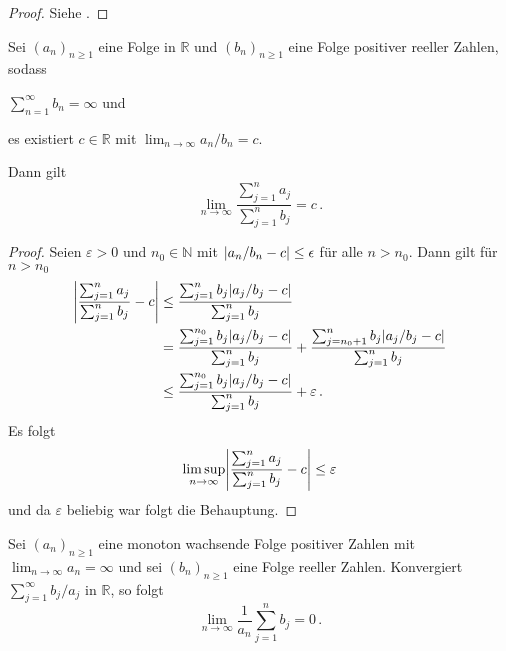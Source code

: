 \documentclass[ngerman,a4paper,11pt]{scrartcl}
\newcommand{\NN}{\mathbb{N}}
\newcommand{\RR}{\mathbb{R}}
\DeclarePairedDelimiter{\abs}{\lvert}{\rvert}		%
\begin{document}
\begin{proof}
 Siehe \cite[Satz~5.31 und Bemerkung~5.32(a)]{lpw}.
\end{proof}
\begin{lem}\label{lem:lhospital}
 Sei $(a_n)_{n\geq 1}$ eine Folge in $\RR$ und $(b_n)_{n\geq 1}$ eine Folge positiver reeller Zahlen, sodass 
 \begin{thmasslist}
 \item 
     $\sum_{n=1}^\infty b_n=\infty$ und
 \item es existiert $c\in\RR$ mit $\lim_{n\to\infty}a_n/b_n=c$.
 \end{thmasslist}
 Dann gilt
 \begin{equation*}
  \lim_{n\to\infty} \frac{\sum_{j=1}^na_j}{\sum_{j=1}^nb_j}=c\,.
 \end{equation*}
\end{lem}
\begin{proof}
 Seien $\varepsilon >0$ und $n_0\in\NN$ mit $\abs{a_n/b_n-c}\leq\epsilon$
 für alle $n>n_0$. Dann gilt für $n>n_0$
 \begin{align*}
  \abs*{\frac{\sum_{j=1}^na_j}{\sum_{j=1}^nb_j}-c}&\leq\frac{\sum_{j=1}^nb_j\abs{a_j/b_j-c}}{\sum_{j=1}^nb_j} \\
&=\frac{\sum_{j=1}^{n_0}b_j\abs{a_j/b_j-c}}{\sum_{j=1}^nb_j}+\frac{\sum_{j=n_0+1}^nb_j\abs{a_j/b_j-c}}{\sum_{j=1}^nb_j} \\
&\leq\frac{\sum_{j=1}^{n_0}b_j\abs{a_j/b_j-c}}{\sum_{j=1}^nb_j}+\varepsilon\,.
 \end{align*}
Es folgt
\begin{equation*}
  \limsup_{n\to\infty} \abs*{\frac{\sum_{j=1}^na_j}{\sum_{j=1}^nb_j}-c}\leq\varepsilon
\end{equation*}
und da $\varepsilon$ beliebig war folgt die Behauptung.
\end{proof}
\begin{lem}\label{lem:kronecker}
 Sei $(a_n)_{n\geq 1}$ eine monoton wachsende Folge positiver Zahlen mit
 $\lim_{n\to\infty}a_n=\infty$ und sei $(b_n)_{n\geq 1}$ eine Folge reeller
 Zahlen. Konvergiert $\sum_{j=1}^\infty b_j/a_j$ in $\RR$, so folgt
 \begin{equation*}
  \lim_{n\to\infty} \frac{1}{a_n}\sum_{j=1}^nb_j=0\,.
 \end{equation*}
\end{lem}
\end{document}
